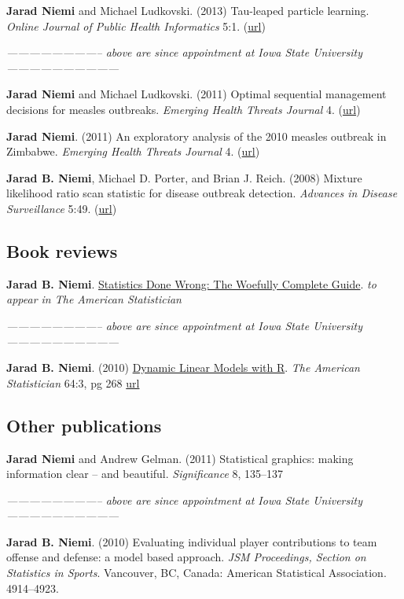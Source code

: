 \documentclass[overlapped,line]{res}
\newcommand{\sinceappt}{\emph{-------------------------- above are since appointment at Iowa State University ------------------------------}}
\newcommand{\sinceappt}{}
\begin{document}
\begin{resume}
{\bf Jarad Niemi} and Michael Ludkovski. (2013) Tau-leaped particle learning. \emph{Online Journal of Public Health Informatics} 5:1. (\href{http://dx.doi.org/10.5210%2Fojphi.v5i1.4575}{url})

\sinceappt

{\bf Jarad Niemi} and Michael Ludkovski. (2011) Optimal sequential management decisions for measles outbreaks. \emph{Emerging Health Threats Journal} 4. (\href{http://dx.doi.org/10.3402/ehtj.v4i0.11907}{url})

{\bf Jarad Niemi}. (2011) An exploratory analysis of the 2010 measles outbreak in Zimbabwe. \emph{Emerging Health Threats Journal} 4. (\href{http://dx.doi.org/10.3402/ehtj.v4i0.11907}{url})

{\bf Jarad B. Niemi}, Michael D. Porter, and Brian J. Reich. (2008) Mixture likelihood ratio scan statistic for disease outbreak detection. \emph{Advances in Disease Surveillance} 5:49. (\href{http://faculty.washington.edu/lober/www.isdsjournal.org/htdocs/articles/3251.pdf}{url})



\subsection{\bf Book reviews} \vspace{-0.2in}

{\bf Jarad B. Niemi}. \underline{Statistics Done Wrong: The Woefully Complete Guide}. \emph{to appear in The American Statistician} 

\sinceappt

{\bf Jarad B. Niemi}. (2010) \underline{Dynamic Linear Models with R}. \emph{The American Statistician} 64:3, pg 268 \href{http://dx.doi.org/10.1198/tast.2010.br643}{url}



\subsection{\bf Other publications} \vspace{-0.2in}

{\bf Jarad Niemi} and Andrew Gelman. (2011) Statistical graphics: making information clear -- and beautiful. \emph{Significance} 8, 135--137

\sinceappt

{\bf Jarad B. Niemi}. (2010) Evaluating individual player contributions to team offense and defense: a model based approach. \emph{JSM Proceedings, Section on Statistics in Sports}. Vancouver, BC, Canada: American Statistical Association. 4914--4923.


\end{resume}
\end{document}

